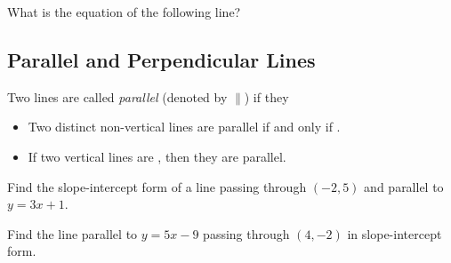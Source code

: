 \vspace{0.5em}

\begin{exercise}
What is the equation of the following line?
\begin{center}
\end{center}
\end{exercise}

\subsection{Parallel and Perpendicular Lines}

\begin{definition}\label{def: Parallel lines}
Two lines are called \emph{parallel} (denoted by $\parallel$) 
if they 
\end{definition}

\begin{prop}\label{prop: parallel line conditions}
\text{}
\begin{itemize}
    \item Two distinct non-vertical lines are parallel if and only if
   .
   \item If two vertical lines are , then
   they are parallel.
\end{itemize}
\end{prop}

\begin{exercise}
Find the slope-intercept form of a line passing through $(-2,5)$
and parallel to $y=3x+1$.
\end{exercise}
\begin{solution}[2in]

\end{solution}

\newpage

\begin{exercise}
Find the line parallel to $y=5x-9$ passing through $(4,-2)$ in slope-intercept form.
\end{exercise}
\begin{solution}[2in]

\end{solution}

